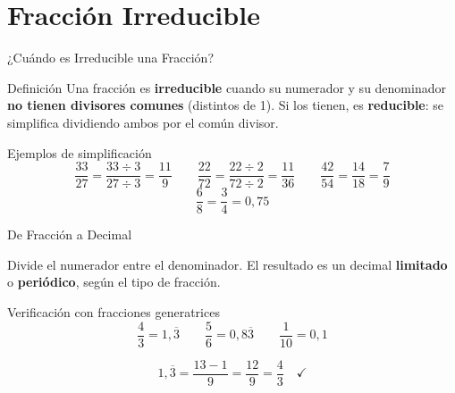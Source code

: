 \documentclass[aspectratio=169]{beamer}
\begin{document}
\section{Fracción Irreducible}

\begin{frame}{¿Cuándo es Irreducible una Fracción?}
  \begin{block}{Definición}
    Una fracción es \textbf{irreducible} cuando su numerador y su
    denominador \textbf{no tienen divisores comunes} (distintos de 1).
    Si los tienen, es \textbf{reducible}: se simplifica dividiendo
    ambos por el común divisor.
  \end{block}
  \vspace{4pt}
  \begin{exampleblock}{Ejemplos de simplificación}
    \[
      \frac{33}{27} = \frac{33 \div 3}{27 \div 3} = \frac{11}{9}
      \qquad
      \frac{22}{72} = \frac{22 \div 2}{72 \div 2} = \frac{11}{36}
      \qquad
      \frac{42}{54} = \frac{14}{18} = \frac{7}{9}
    \]
    \[
      \frac{6}{8} = \frac{3}{4} = 0{,}75
    \]
  \end{exampleblock}
\end{frame}

\begin{frame}{De Fracción a Decimal}
  \begin{mwpasos}[Procedimiento]
    Divide el numerador entre el denominador. El resultado es un
    decimal \textbf{limitado} o \textbf{periódico}, según el tipo de
    fracción.
  \end{mwpasos}
  \vspace{4pt}
  \begin{exampleblock}{Verificación con fracciones generatrices}
    \[
      \frac{4}{3} = 1{,}\overline{3}
      \qquad
      \frac{5}{6} = 0{,}8\overline{3}
      \qquad
      \frac{1}{10} = 0{,}1
    \]
  \end{exampleblock}
  \vspace{4pt}
  \begin{mwextra}
    \[
      1{,}\overline{3} = \frac{13 - 1}{9} = \frac{12}{9} = \frac{4}{3}
      \quad \checkmark
    \]
  \end{mwextra}
\end{frame}
\end{document}
